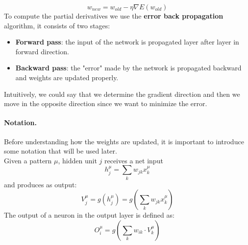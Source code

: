 $$w_{new} = w_{old} - \eta \nabla E(w_{old})$$
To compute the partial derivatives we use the \textbf{error back propagation} algorithm, it consists of two stages:
\begin{itemize}
	\item \textbf{Forward pass}: the input of the network is propagated layer after layer in forward direction.
	\item \textbf{Backward pass}: the "error" made by the network is propagated backward and weights are updated properly.
\end{itemize}
Intuitively, we could say that we determine the gradient direction and then we move in the opposite direction since we want to minimize the error.


\paragraph*{Notation.} Before understanding how the weights are updated, it is important to introduce some notation that will be used later.\\
Given a pattern $\mu$, hidden unit $j$ receives a net input
$$h _ { j } ^ { \mu } = \sum _ { k } w _ { j k } x _ { k } ^ { \mu }$$
and produces as output:
$$V _ { j } ^ { \mu } = g \left( h _ { j } ^ { \mu } \right) = g \left( \sum _ { k } w _ { j k } x _ { k } ^ { \mu } \right)$$
The output of a neuron in the output layer is defined as:
$$O _ {i} ^ {\mu} = g(\sum _ k w_{ik} \cdot V _ {k} ^ {\mu})$$

